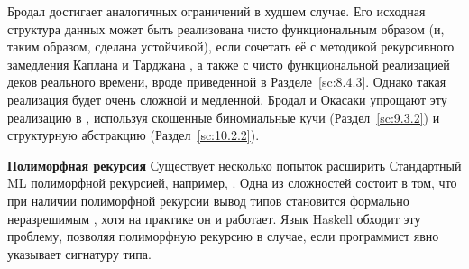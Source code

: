 Бродал \cite{Brodal1995, Brodal1996} достигает аналогичных ограничений
в худшем случае. Его исходная структура данных \cite{Brodal1995} может
быть реализована чисто функциональным образом (и, таким образом,
сделана устойчивой), если сочетать её с методикой рекурсивного
замедления Каплана и Тарджана \cite{KaplanTarjan1995}, а также с чисто
функциональной реализацией деков реального времени, вроде приведенной
в Разделе~\ref{sc:8.4.3}. Однако такая реализация будет
очень сложной и медленной. Бродал и Окасаки упрощают эту реализацию в
\cite{BrodalOkasaki1996}, используя скошенные биномиальные кучи
(Раздел~\ref{sc:9.3.2}) и структурную абстракцию (Раздел~\ref{sc:10.2.2}).

\noindent
\textbf{Полиморфная рекурсия} Существует несколько попыток расширить
Стандартный ML полиморфной рекурсией, например, \cite{Myers1984,
  Henglein1993, KfouryTiurynUrzyczyn1993}. Одна из сложностей
состоит в том, что при наличии полиморфной рекурсии вывод типов
становится формально неразрешимым \cite{Henglein1993, KfouryTiurynUrzyczyn1993},
хотя на практике он и работает. Язык Haskell обходит эту проблему,
позволяя полиморфную рекурсию в случае, если программист явно
указывает сигнатуру типа.

